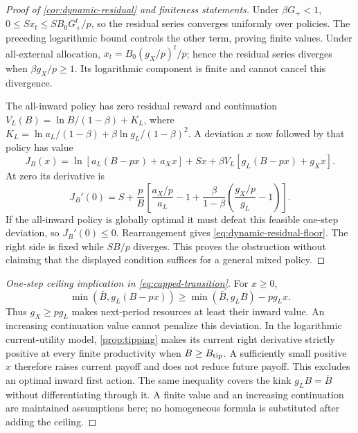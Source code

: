 \begin{proof}[Proof of \cref{cor:dynamic-residual} and finiteness statements]
Under $\beta G_+<1$, $0\leq Sx_t\leq SB_0G_+^t/p$, so the residual
series converges uniformly over policies. The preceding logarithmic bound
controls the other term, proving finite values. Under all-external
allocation, $x_t=B_0(g_X/p)^t/p$; hence the residual series diverges
when $\beta g_X/p\geq1$. Its logarithmic component is finite and cannot
cancel this divergence.

The all-inward policy has zero residual reward and continuation
$V_L(B)=\ln B/(1-\beta)+K_L$, where
$K_L=\ln a_L/(1-\beta)+\beta\ln g_L/(1-\beta)^2$.
A deviation $x$ now followed by that policy has value
\[
 J_B(x)=\ln[a_L(B-px)+a_Xx]+Sx
       +\beta V_L[g_L(B-px)+g_Xx].
\]
At zero its derivative is
\[
 J_B'(0)=S+\frac pB\left[
 \frac{a_X/p}{a_L}-1+
 \frac\beta{1-\beta}\left(\frac{g_X/p}{g_L}-1\right)\right].
\]
If the all-inward policy is globally optimal it must defeat this feasible
one-step deviation, so $J_B'(0)\leq0$. Rearrangement gives
\cref{eq:dynamic-residual-floor}. The right side is fixed while $SB/p$
diverges. This proves the obstruction without claiming that the displayed
condition suffices for a general mixed policy.
\end{proof}

\begin{proof}[One-step ceiling implication in \cref{eq:capped-transition}]
For $x\geq0$,
\[
 \min(\bar B,g_L(B-px))\geq\min(\bar B,g_LB)-pg_Lx.
\]
Thus $g_X\geq pg_L$ makes next-period resources at least their inward
value. An increasing continuation value cannot penalize this deviation.
In the logarithmic current-utility model, \cref{prop:tipping} makes its
current right derivative strictly positive at every finite productivity
when $B\geq B_{\rm tip}$. A sufficiently small positive $x$ therefore
raises current payoff and does not reduce future payoff. This excludes an
optimal inward first action. The same inequality covers the kink
$g_LB=\bar B$ without differentiating through it. A finite value and an
increasing continuation are maintained assumptions here; no homogeneous
formula is substituted after adding the ceiling.
\end{proof}
